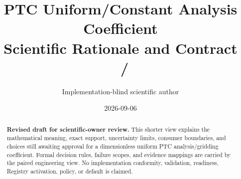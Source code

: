 \documentclass[10pt]{article}
\makeatletter
\def\ps@draftheadings{%
  \def\@oddhead{\normalfont\small Scientific Rationale and Contract
    v0.1-draft.1/r0.4\hfil\thepage}%
  \let\@evenhead\@oddhead
  \def\@oddfoot{}\let\@evenfoot\@oddfoot}
\let\ps@plain\ps@draftheadings
\makeatother
\begin{document}
\makeatletter
\let\ps@plain\ps@draftheadings
\let\ps@headings\ps@draftheadings
\let\ps@myheadings\ps@draftheadings
\makeatother
\let\DraftOriginalThisPageStyle\thispagestyle
\renewcommand{\thispagestyle}[1]{\DraftOriginalThisPageStyle{draftheadings}}
\title{PTC Uniform/Constant Analysis Coefficient\\
Scientific Rationale and Contract\\
\large \ContractIdentity\ \ContractVersion\ /\ \DocumentRevision}
\author{Implementation-blind scientific author}
\date{2026-09-06}
\newcommand{\ContractIdentity}{SCI-PTC-COEFFICIENT-UNIFORM}
\newcommand{\ContractVersion}{v0.1-draft.1}
\newcommand{\DocumentRevision}{r0.4}
\pagestyle{draftheadings}
\maketitle
\thispagestyle{draftheadings}
\begin{abstract}
\textbf{Revised draft for scientific-owner review.} This shorter view explains
the mathematical meaning, exact support, uncertainty limits, consumer
boundaries, and choices still awaiting approval for a dimensionless uniform
PTC analysis/gridding coefficient. Formal decision rules, failure scopes, and
evidence mappings are carried by the paired engineering view. No
implementation conformity, validation, readiness, Registry activation,
policy, or default is claimed.
\end{abstract}

\end{document}
